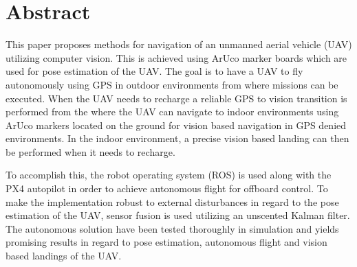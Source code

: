 \documentclass[../Head/report.tex]{subfiles}
\begin{document}
\section{Abstract}

This paper proposes methods for navigation of an unmanned aerial vehicle (UAV) utilizing computer vision. This is achieved using ArUco marker boards which are used for pose estimation of the UAV. The goal is to have a UAV to fly autonomously using GPS in outdoor environments from where missions can be executed. When the UAV needs to recharge a reliable GPS to vision transition is performed from the where the UAV can navigate to indoor environments using ArUco markers located on the ground for vision based navigation in GPS denied environments. In the indoor environment, a precise vision based landing can then be performed when it needs to recharge. 

To accomplish this, the robot operating system (ROS) is used along with the PX4 autopilot in order to achieve autonomous flight for offboard control. To make the implementation robust to external disturbances in regard to the pose estimation of the UAV, sensor fusion is used utilizing an unscented Kalman filter. The autonomous solution have been tested thoroughly in simulation and yields promising results in regard to pose estimation, autonomous flight and vision based landings of the UAV.   
\end{document}
